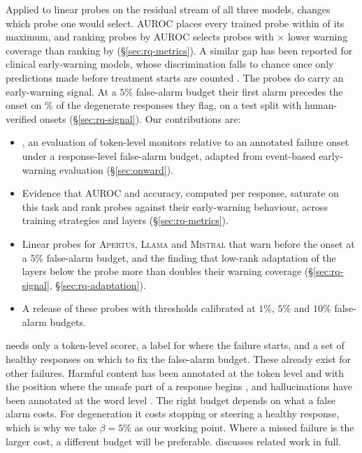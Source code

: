 Applied to linear probes on the residual stream of all three models, \method{}
changes which probe one would select. AUROC places every trained probe within
 of its maximum, and ranking probes by AUROC selects probes with
$\times$ lower warning coverage than ranking by \method{}
(\S\ref{sec:rq-metrics}). A similar gap has been reported for clinical
early-warning models, whose discrimination falls to chance once only
predictions made before treatment starts are counted
\citep{kamran2024sepsis}. The probes do carry an early-warning signal. At a
$5\%$ false-alarm budget their first alarm precedes the onset on
\% of the degenerate responses they flag, on a test split with
human-verified onsets (\S\ref{sec:rq-signal}). Our contributions are:
\begin{itemize}
  \item \method{}, an evaluation of token-level monitors relative to an
  annotated failure onset under a response-level false-alarm budget, adapted
  from event-based early-warning evaluation (\S\ref{sec:onward}).
  \item Evidence that AUROC and accuracy, computed per response, saturate on
  this task and rank probes against their early-warning behaviour, across
  training strategies and layers (\S\ref{sec:rq-metrics}).
  \item Linear probes for \textsc{Apertus}, \textsc{Llama} and \textsc{Mistral}
  that warn before the onset at a $5\%$ false-alarm budget, and the finding that
  low-rank adaptation of the layers below the probe more than doubles their
  warning coverage (\S\ref{sec:rq-signal}, \S\ref{sec:rq-adaptation}).
  \item A release of these probes with thresholds calibrated at $1\%$, $5\%$
  and $10\%$ false-alarm budgets.
\end{itemize}

\method{} needs only a token-level scorer, a label for where the failure starts,
and a set of healthy responses on which to fix the false-alarm budget. These
already exist for other failures. Harmful content has been annotated at the
token level \citep{li2025fineharm} and with the position where the unsafe part
of a response begins \citep{singteam2026singprobe}, and hallucinations have been
annotated at the word level \citep{niu2024ragtruth}. The right budget depends on
what a false alarm costs. For degeneration it costs stopping or steering a
healthy response, which is why we take $\beta=5\%$ as our working point. Where a
missed failure is the larger cost, a different budget will be preferable.
 discusses related work in full.
